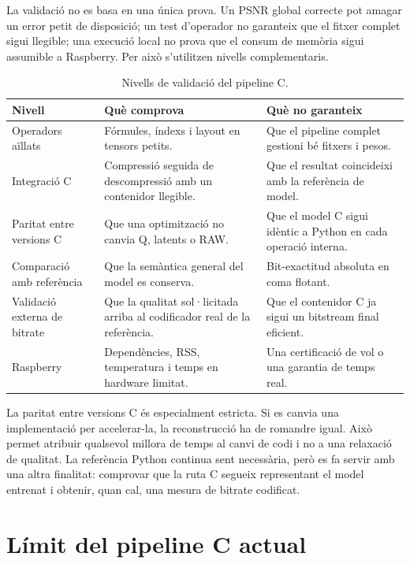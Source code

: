 La validació no es basa en una única prova. Un PSNR global correcte pot amagar
un error petit de disposició; un test d'operador no garanteix que el fitxer
complet sigui llegible; una execució local no prova que el consum de memòria
sigui assumible a Raspberry. Per això s'utilitzen nivells complementaris.

\begin{table}[H]
\centering
\small
\begin{tabularx}{\textwidth}{p{3.2cm}X X}
\toprule
Nivell & Què comprova & Què no garanteix \\
\midrule
Operadors aïllats & Fórmules, índexs i layout en tensors petits. & Que el
pipeline complet gestioni bé fitxers i pesos. \\
Integració C & Compressió seguida de descompressió amb un contenidor llegible.
& Que el resultat coincideixi amb la referència de model. \\
Paritat entre versions C & Que una optimització no canvia Q, latents o RAW. &
Que el model C sigui idèntic a Python en cada operació interna. \\
Comparació amb referència & Que la semàntica general del model es conserva. &
Bit-exactitud absoluta en coma flotant. \\
Validació externa de bitrate & Que la qualitat sol·licitada arriba al
codificador real de la referència. & Que el contenidor C ja sigui un bitstream
final eficient. \\
Raspberry & Dependències, RSS, temperatura i temps en hardware limitat. & Una
certificació de vol o una garantia de temps real. \\
\bottomrule
\end{tabularx}
\caption{Nivells de validació del pipeline C.}
\label{tab:test_matrix}
\end{table}

La paritat entre versions C és especialment estricta. Si es canvia una
implementació per accelerar-la, la reconstrucció ha de romandre igual. Això
permet atribuir qualsevol millora de temps al canvi de codi i no a una
relaxació de qualitat. La referència Python continua sent necessària, però es
fa servir amb una altra finalitat: comprovar que la ruta C segueix representant
el model entrenat i obtenir, quan cal, una mesura de bitrate codificat.

\section{Límit del pipeline C actual}\label{sec:limit_c}

